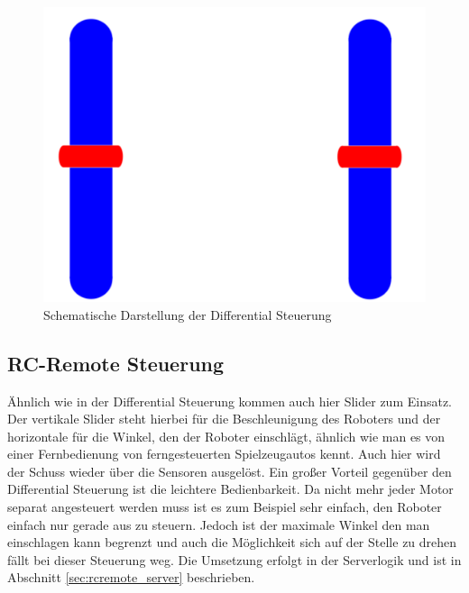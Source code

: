 \begin{figure}[h!]
	\centering
	\includegraphics[height=.25\textheight]{images/android_diff.pdf}
	\caption{Schematische Darstellung der Differential Steuerung}
	\label{fig:android_diff}
\end{figure}

\subsection{RC-Remote Steuerung}

Ähnlich wie in der Differential Steuerung kommen auch hier Slider zum Einsatz. Der vertikale Slider steht hierbei für die Beschleunigung des Roboters und der horizontale für die Winkel, den der Roboter einschlägt, ähnlich wie man es von einer Fernbedienung von ferngesteuerten Spielzeugautos kennt. Auch hier wird der Schuss wieder über die Sensoren ausgelöst. Ein großer Vorteil gegenüber den Differential Steuerung ist die leichtere Bedienbarkeit. Da nicht mehr jeder Motor separat angesteuert werden muss ist es zum Beispiel sehr einfach, den Roboter einfach nur gerade aus zu steuern. Jedoch ist der maximale Winkel den man einschlagen kann begrenzt und auch die Möglichkeit sich auf der Stelle zu drehen fällt bei dieser Steuerung weg. Die Umsetzung erfolgt in der Serverlogik und ist in Abschnitt \ref{sec:rcremote_server} beschrieben.


